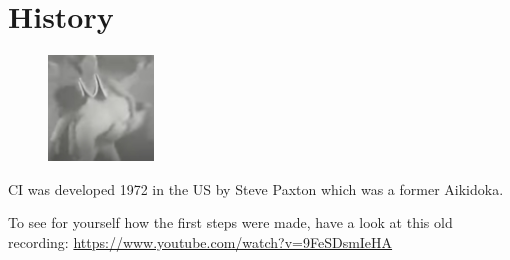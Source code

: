 \section{History}

\begin{figure}
\centering
\includegraphics[width=0.25\textwidth]{images/history.jpg}
\end{figure}

CI was developed 1972 in the US by Steve Paxton which was a former Aikidoka.


To see for yourself how the first steps were made, have a look at this old recording: \url{https://www.youtube.com/watch?v=9FeSDsmIeHA}